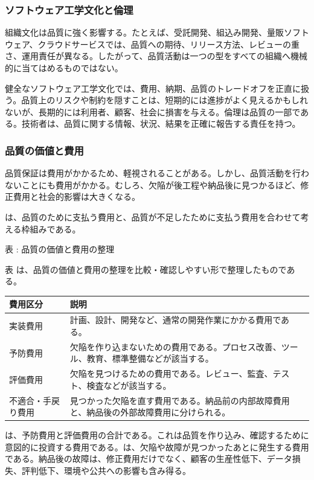 \subsubsection{ソフトウェア工学文化と倫理}
組織文化は品質に強く影響する。たとえば、受託開発、組込み開発、量販ソフトウェア、クラウドサービスでは、品質への期待、リリース方法、レビューの重さ、運用責任が異なる。したがって、品質活動は一つの型をすべての組織へ機械的に当てはめるものではない。

健全なソフトウェア工学文化では、費用、納期、品質のトレードオフを正直に扱う。品質上のリスクや制約を隠すことは、短期的には進捗がよく見えるかもしれないが、長期的には利用者、顧客、社会に損害を与える。倫理は品質の一部である。技術者は、品質に関する情報、状況、結果を正確に報告する責任を持つ。

\subsubsection{品質の価値と費用}
品質保証は費用がかかるため、軽視されることがある。しかし、品質活動を行わないことにも費用がかかる。むしろ、欠陥が後工程や納品後に見つかるほど、修正費用と社会的影響は大きくなる。

は、品質のために支払う費用と、品質が不足したために支払う費用を合わせて考える枠組みである。


\noindent\par\smallskip\noindent{}\label{tab:ch12-03}表 \thetable: 品質の価値と費用の整理\par\smallskip
表 \thetable は、品質の価値と費用の整理を比較・確認しやすい形で整理したものである。\par\smallskip
\begin{tabularx}{\textwidth}{L{0.24\textwidth}Y}
\toprule
費用区分 & 説明 \\
\midrule
実装費用 & 計画、設計、開発など、通常の開発作業にかかる費用である。 \\
予防費用 & 欠陥を作り込まないための費用である。プロセス改善、ツール、教育、標準整備などが該当する。 \\
評価費用 & 欠陥を見つけるための費用である。レビュー、監査、テスト、検査などが該当する。 \\
不適合・手戻り費用 & 見つかった欠陥を直す費用である。納品前の内部故障費用と、納品後の外部故障費用に分けられる。 \\
\bottomrule
\end{tabularx}


は、予防費用と評価費用の合計である。これは品質を作り込み、確認するために意図的に投資する費用である。は、欠陥や故障が見つかったあとに発生する費用である。納品後の故障は、修正費用だけでなく、顧客の生産性低下、データ損失、評判低下、環境や公共への影響も含み得る。

